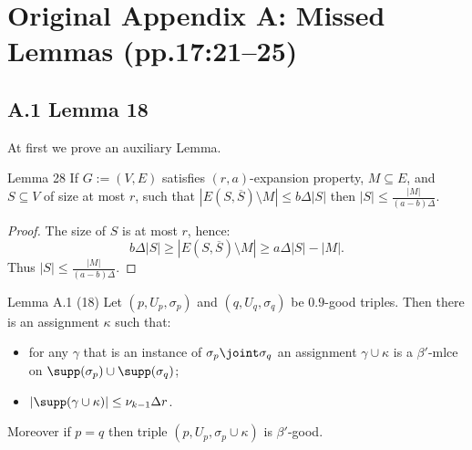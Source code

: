 \section*{Original Appendix A: Missed Lemmas (pp.17:21--25)}
\subsection*{A.1 Lemma 18}
At first we prove an auxiliary Lemma.
\begin{result}{Lemma 28}
If $G:=(V,E)$ satisfies $(r,a)$-expansion property, $M\subseteq E$, and $S\subseteq V$ of size at most $r$, such that $|E(S,\overline S)\setminus M|\le b\Delta|S|$ then $|S|\le\frac{|M|}{(a-b)\Delta}$.
\end{result}
\begin{proof}
The size of $S$ is at most $r$, hence:
\[b\Delta|S|\ge|E(S,\overline S)\setminus M|\ge a\Delta|S|-|M|.\]
Thus $|S|\le\frac{|M|}{(a-b)\Delta}$.
\end{proof}
\begin{result}{Lemma A.1 (18)}
Let $(p,U_p,\sigma_p)$ and $(q,U_q,\sigma_q)$ be $0.9$-good triples. Then there is an assignment $\kappa$ such that:
\begin{itemize}\item for any $\gamma$ that is an instance of $\sigma_p\joint\sigma_q$ an assignment $\gamma\cup\kappa$ is a $\beta'$-mlce on $\supp(\sigma_p)\cup\supp(\sigma_q)$;
\item $|\supp(\gamma\cup\kappa)|\le\nu_{k-1}\Delta r$.\end{itemize}
Moreover if $p=q$ then triple $(p,U_p,\sigma_p\cup\kappa)$ is $\beta'$-good.
\end{result}

